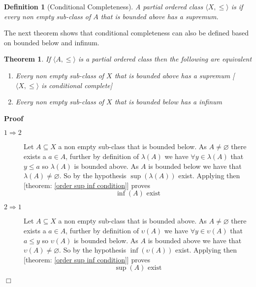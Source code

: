 \documentclass{book}
\newcommand{\tmtextbf}[1]{\text{{\bfseries{#1}}}}
\newenvironment{proof}{\noindent\textbf{Proof\ }}{\hspace*{\fill}$\Box$\medskip}
\newtheorem{definition}{Definition}
{\theorembodyfont{\rmfamily}\newtheorem{example}{Example}}
\newtheorem{theorem}{Theorem}
\begin{document}
\begin{definition}[Conditional Completeness]
  \label{order conditional complete order}{}A
  partial ordered class $\langle X, \leqslant \rangle$ is
  \tmtextbf{conditional complete }if every non empty sub-class of $A$ that is
  bounded above has a supremum.
\end{definition}

The next theorem shows that conditional completeness can also be defined based
on bounded below and infinum.

\begin{theorem}
  \label{order conditional complete alternatives}If $\langle A, \leqslant
  \rangle$ is a partial ordered class then the following are equivalent
  \begin{enumerate}
    \item Every non empty sub-class of $X$ that is bounded above has a
    supremum [$\langle X, \leqslant \rangle$ is conditional complete]
    
    \item Every non empty sub-class of $X$ that is bounded below has a infinum
    
  \end{enumerate}
\end{theorem}

\begin{proof}
  
  \begin{description}
    \item[$1 \Rightarrow 2$] Let $A \subseteq X$ a non empty sub-class that is
    bounded below. As $A \neq \varnothing$ there exists a $a \in A$, further
    by definition of $\lambda (A)$ we have $\forall y \in \lambda (A)$ that $y
    \leqslant a$ so $\lambda (A)$ is bounded above. As $A$ is bounded below we
    have that $\lambda (A) \neq \varnothing$. So by the hypothesis $\sup
    (\lambda (A))$ exist. Applying then [theorem: \ref{order sup inf
    condition}] proves
    \[ \inf (A) \text{ exist} \]
    \item[$2 \Rightarrow 1$] Let $A \subseteq X$ a non empty sub-class that is
    bounded above. As $A \neq \varnothing$ there exists a $a \in A$, further
    by definition of $\upsilon (A)$ we have $\forall y \in \upsilon (A)$ that
    $a \leqslant y$ so $\upsilon (A)$ is bounded below. As $A$ is bounded
    above we have that $\upsilon (A) \neq \varnothing$. So by the hypothesis
    $\inf (\upsilon (A))$ exist. Applying then [theorem: \ref{order sup inf
    condition}] proves
    \[ \sup (A) \text{ exist} \]
  \end{description}
\end{proof}
\end{document}
